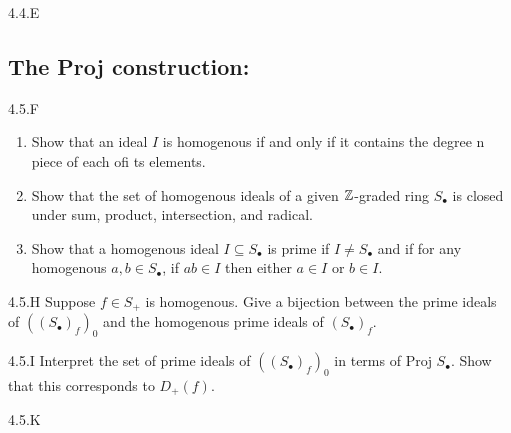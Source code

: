 \begin{exercise}{4.4.E}

\end{exercise}
\begin{solution}
    \todo{}
\end{solution}

\subsection{The Proj construction:}

\begin{exercise}{4.5.F}
    \begin{enumerate}
        \item Show that an ideal $I$ is homogenous if and only if it contains the degree n piece of each ofi ts elements. 
        \item Show that the set of homogenous ideals of a given $\mathbb Z$-graded ring $S_\bullet$ is closed under sum, product, intersection, and radical. 
        \item Show that a homogenous ideal $I \subseteq S_\bullet$ is prime if $I \neq S_\bullet$ and if for any homogenous $a, b \in S_\bullet$, if $ab \in I$ then either $a \in I$ or $b \in I$.
    \end{enumerate}
\end{exercise}
\begin{solution}
    \todo{}
\end{solution}

\begin{exercise}{4.5.H}
    Suppose $f \in S_+$ is homogenous. Give a bijection between the prime ideals of $((S_\bullet)_f)_0$ and the homogenous prime ideals of $(S_\bullet)_f$.
\end{exercise}
\begin{solution}
    \todo{}
\end{solution}

\begin{exercise}{4.5.I}
    Interpret the set of prime ideals of $((S_\bullet)_f)_0$ in terms of $\text{Proj } S_\bullet$. Show that this corresponds to $D_+(f)$.
\end{exercise}
\begin{solution}
    \todo{}
\end{solution}

\begin{exercise}{4.5.K}

\end{exercise}
\begin{solution}
    \todo{}
\end{solution}

